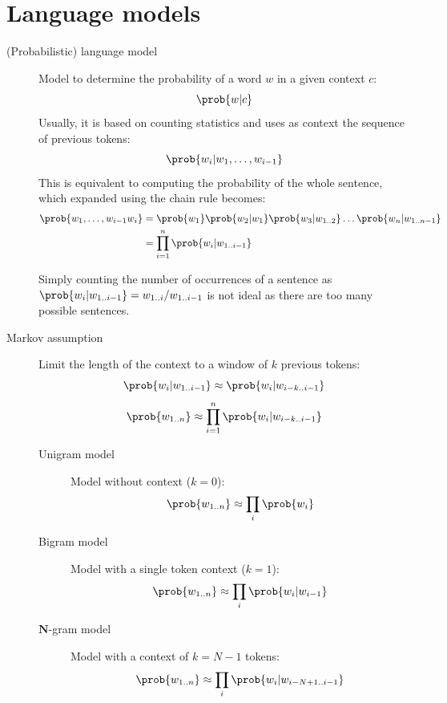 \section{Language models}

\begin{description}
    \item[(Probabilistic) language model] 
        Model to determine the probability of a word $w$ in a given context $c$:
        \[ \prob{w | c} \]
        Usually, it is based on counting statistics and uses as context the sequence of previous tokens:
        \[ \prob{w_i | w_1, \dots, w_{i-1}} \]
        This is equivalent to computing the probability of the whole sentence, which expanded using the chain rule becomes:
        \[
            \begin{split}
                \prob{w_1, \dots, w_{i-1} w_i} &= \prob{w_1} \prob{w_2 | w_1} \prob{w_3 | w_{1..2}} \dots \prob{w_n | w_{1..n-1}} \\
                &= \prod_{i=1}^{n} \prob{w_i | w_{1..i-1}}
            \end{split}
        \]

        \begin{remark}
            Simply counting the number of occurrences of a sentence as $\prob{w_i | w_{1..i-1}} = w_{1..i} / w_{1..i-1}$ is not ideal as there are too many possible sentences.
        \end{remark}

    \item[Markov assumption] 
        Limit the length of the context to a window of $k$ previous tokens:
        \[ \prob{w_i | w_{1..i-1}} \approx \prob{w_i | w_{i-k..i-1}} \]
        \[ \prob{w_{1..n}} \approx \prod_{i=1}^{n} \prob{w_i | w_{i-k..i-1}} \]

        \begin{description}
            \item[Unigram model]
                Model without context ($k=0$):
                \[ \prob{w_{1..n}} \approx \prod_i \prob{w_i} \]

            \item[Bigram model]
                Model with a single token context ($k=1$):
                \[ \prob{w_{1..n}} \approx \prod_i \prob{w_i | w_{i-1}} \]

            \item[$\mathbf{N}$-gram model] 
                Model with a context of $k=N-1$ tokens:
                \[ \prob{w_{1..n}} \approx \prod_i \prob{w_i | w_{i-N+1..i-1}} \]


\end{description}
\end{description}
